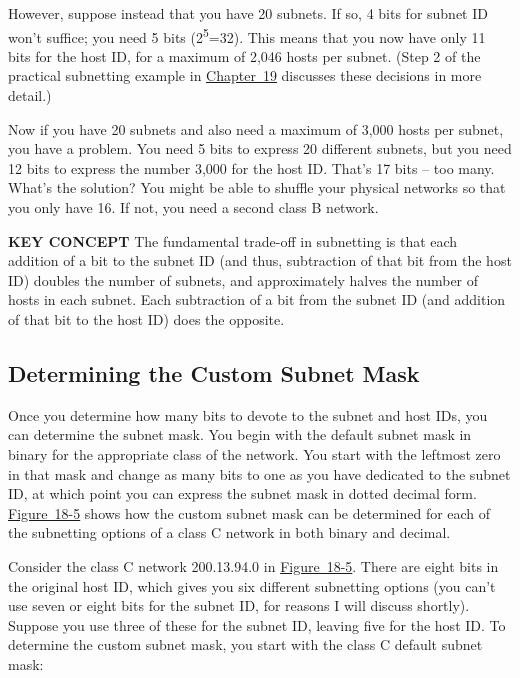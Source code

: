 However, suppose instead that you have 20 subnets. If so, 4 bits for
subnet ID won't suffice; you need 5 bits (2\textsuperscript{5}=32). This
means that you now have only 11 bits for the host ID, for a maximum of
2,046 hosts per subnet. (Step 2 of the practical subnetting example in
\protect\hyperlink{ch19.html}{Chapter~19} discusses these decisions in
more detail.)

Now if you have 20 subnets and also need a maximum of 3,000 hosts per
subnet, you have a problem. You need 5 bits to express 20 different
subnets, but you need 12 bits to express the number 3,000 for the host
ID. That's 17 bits -- too many. What's the solution? You might be able to
shuffle your physical networks so that you only have 16. If not, you
need a second class B network.


{\textbf{KEY CONCEPT}} The fundamental trade-off in subnetting is that
each addition of a bit to the subnet ID (and thus, subtraction of that
bit from the host ID) doubles the number of subnets, and approximately
halves the number of hosts in each subnet. Each subtraction of a bit
from the subnet ID (and addition of that bit to the host ID) does the
opposite.

\subsection[Determining the Custom Subnet
Mask]{\texorpdfstring{\protect\hypertarget{ch18s05.htmlux5cux23determining_the_custom_subnet_mask}{}{}Determining
the Custom Subnet Mask}{Determining the Custom Subnet Mask}}

Once you determine how many bits to devote to the subnet and host IDs,
you can determine the subnet mask. You begin with the default subnet
mask in binary for the appropriate class of the network. You start with
the leftmost zero in that mask and change as many bits to one as you
have dedicated to the subnet ID, at which point you can express the
subnet mask in dotted decimal form.
\protect\hyperlink{ch18s05.htmlux5cux23custom_subnet_masks_for_class_c_networks}{Figure~18-5}
shows how the custom subnet mask can be determined for each of the
subnetting options of a class C network in both binary and decimal.

Consider the class C network 200.13.94.0 in
\protect\hyperlink{ch18s05.htmlux5cux23custom_subnet_masks_for_class_c_networks}{Figure~18-5}.
There are eight bits in the original host ID, which gives you six
different subnetting options (you can't use seven or eight bits for the
subnet ID, for reasons I will discuss shortly). Suppose you use three of
these for the subnet ID, leaving five for the host ID. To determine the
custom subnet mask, you start with the class C default subnet mask:


